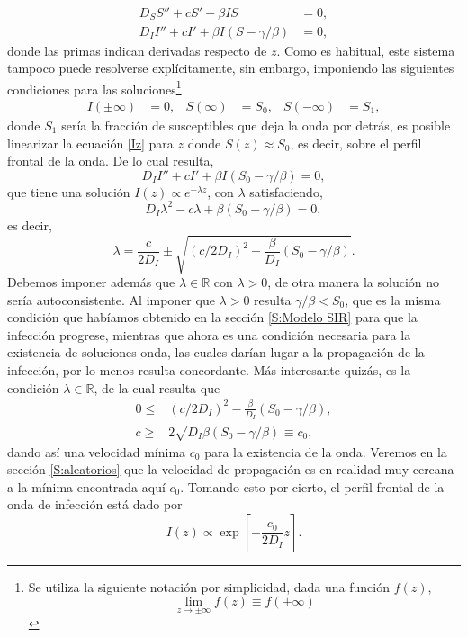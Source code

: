 \begin{align}
  D_S S''+ cS'-\beta IS &=0,\label{Sz} \\[.3cm] D_I I'' + cI' + \beta I(S-\gamma/\beta)&=0, \label{Iz}
\end{align}
donde las primas indican derivadas respecto de $z$. Como es habitual, este sistema tampoco puede resolverse explícitamente, sin embargo, imponiendo las 
siguientes condiciones para las soluciones\footnote{Se utiliza la siguiente notación por simplicidad, dada una función $f(z)$, 
\[\lim_{z\to\pm\infty}f(z)\equiv f(\pm\infty)\]}
\begin{align*}
  I(\pm\infty)&=0,   &  S(\infty) &= S_0,  & S(-\infty) &= S_1,   
\end{align*}
donde $S_1$ sería la fracción de susceptibles que deja la onda por detrás, es posible linearizar la ecuación \ref{Iz} para $z$ donde $S(z)\approx S_0$,
es decir, sobre el perfil frontal de la onda. De lo cual resulta,
\begin{equation}
  D_I I'' + cI'+\beta I(S_0-\gamma/\beta)=0,\label{Idez}
\end{equation}
que tiene una solución $I(z)\propto e^{-\lambda z}$, con $\lambda$ satisfaciendo,
\[D_I \lambda^2 - c \lambda +\beta(S_0-\gamma/\beta)=0,\]
es decir,
\[\lambda = \frac{c}{2D_I}\pm \sqrt{(c/2D_I)^2-\frac{\beta}{D_I}(S_0-\gamma/\beta)}.\]
Debemos imponer además que $\lambda \in \mathds R$ con $\lambda>0$, de otra manera la solución no sería autoconsistente. Al imponer que $\lambda>0$ 
resulta $\gamma/\beta<S_0$, que es la misma condición que habíamos obtenido en la sección \ref{S:Modelo SIR} para que la infección progrese, 
mientras que ahora es una condición necesaria para la existencia de soluciones onda, las cuales darían lugar a la 
propagación de la infección, por lo menos resulta concordante. Más interesante quizás, es la condición $\lambda \in \mathds{R}$, de la cual resulta que 
\begin{align*}
  0\leq&(c/2D_I)^2-\frac{\beta}{D_I}(S_0-\gamma/\beta),\\[.3cm]
  c\geq&2\sqrt{D_I\beta(S_0-\gamma/\beta)}\equiv c_0,
\end{align*}
dando así una velocidad mínima $c_0$ para la existencia de la onda. Veremos en la sección \ref{S:aleatorios} que la velocidad de propagación es en realidad
muy cercana a la mínima encontrada aquí $c_0$. Tomando esto por cierto, el perfil frontal de la onda de infección está dado por 
\begin{equation}
  I(z)\propto \exp[-\frac{c_0}{2D_I}z].\label{larika2}  
\end{equation}

